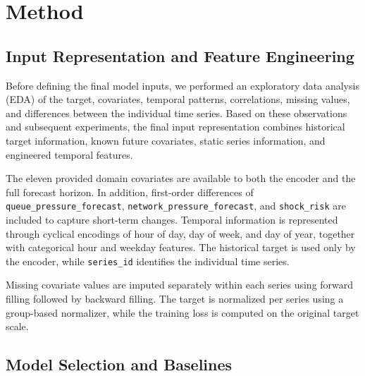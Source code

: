\documentclass[11pt]{article}
\begin{document}

\section{Method}



\subsection{Input Representation and Feature Engineering}

Before defining the final model inputs, we performed an exploratory data analysis (EDA) of the target, covariates, temporal patterns, correlations, missing values, and differences between the individual time series. Based on these observations and subsequent experiments, the final input representation combines historical target information, known future covariates, static series information, and engineered temporal features.
\newline

\noindent
The eleven provided domain covariates are available to both the encoder and the full forecast horizon. In addition, first-order differences of \texttt{queue\_pressure\_forecast}, \texttt{network\_pressure\_forecast}, and \texttt{shock\_risk} are included to capture short-term changes. Temporal information is represented through cyclical encodings of hour of day, day of week, and day of year, together with categorical hour and weekday features. The historical target is used only by the encoder, while \texttt{series\_id} identifies the individual time series.
\newline

\noindent
Missing covariate values are imputed separately within each series using forward filling followed by backward filling. The target is normalized per series using a group-based normalizer, while the training loss is computed on the original target scale.
\newline

\subsection{Model Selection and Baselines}
\end{document}
